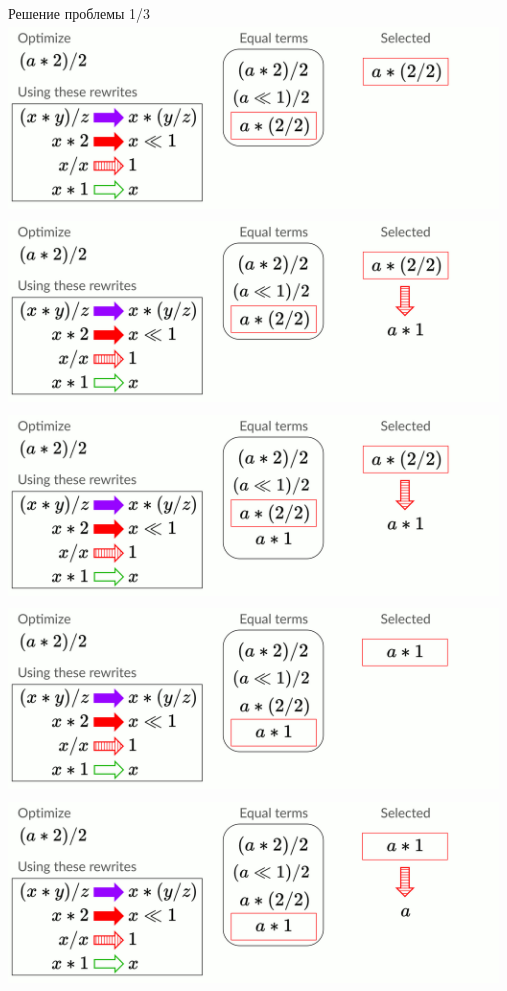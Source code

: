 \documentclass[aspectratio=169
  , xcolor={svgnames}
  , russian  %
  ]{beamer}
\begin{document}
\begin{frame}{Решение проблемы 1/3}
{   }
    {
        \centering
        \includegraphics[width=13cm, height=5cm]{misc/egraphs_images/naive/n-8.jpg}
   }
    {
        \centering
        \includegraphics[width=13cm, height=5cm]{misc/egraphs_images/naive/n-9.jpg}
   }
    {
        \centering
        \includegraphics[width=13cm, height=5cm]{misc/egraphs_images/naive/n-10.jpg}
   }
    {
        \centering
        \includegraphics[width=13cm, height=5cm]{misc/egraphs_images/naive/n-11.jpg}
   }
    {
        \centering
        \includegraphics[width=13cm, height=5cm]{misc/egraphs_images/naive/n-12.jpg}
}
\end{frame}
\end{document}
